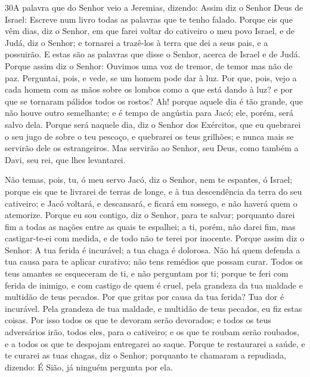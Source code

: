 \medskip

\lettrine{30} A palavra que do Senhor veio a Jeremias,
dizendo: Assim diz o Senhor Deus de Israel: Escreve num livro
todas as palavras que te tenho falado. Porque eis que vêm dias,
diz o Senhor, em que farei voltar do cativeiro o meu povo Israel, e
de Judá, diz o Senhor; e tornarei a trazê-los à terra que dei a seus
pais, e a possuirão. E estas são as palavras que disse o Senhor,
acerca de Israel e de Judá. Porque assim diz o Senhor: Ouvimos
uma voz de tremor, de temor mas não de paz. Perguntai, pois, e
vede, se um homem pode dar à luz. Por que, pois, vejo a cada homem
com as mãos sobre os lombos como a que está dando à luz? e por que
se tornaram pálidos todos os rostos? Ah! porque aquele dia é tão
grande, que não houve outro semelhante; e é tempo de angústia para
Jacó; ele, porém, será salvo dela. Porque será naquele dia, diz
o Senhor dos Exércitos, que eu quebrarei o seu jugo de sobre o teu
pescoço, e quebrarei os teus grilhões; e nunca mais se servirão dele
os estrangeiros. Mas servirão ao Senhor, seu Deus, como também a
Davi, seu rei, que lhes levantarei.

Não temas, pois, tu, ó meu servo Jacó, diz o Senhor, nem te
espantes, ó Israel; porque eis que te livrarei de terras de longe, e
à tua descendência da terra do seu cativeiro; e Jacó voltará, e
descansará, e ficará em sossego, e não haverá quem o atemorize.
Porque eu sou contigo, diz o Senhor, para te salvar;
porquanto darei fim a todas as nações entre as quais te espalhei; a
ti, porém, não darei fim, mas castigar-te-ei com medida, e de todo
não te terei por inocente. Porque assim diz o Senhor: A tua
ferida é incurável; a tua chaga é dolorosa. Não há quem
defenda a tua causa para te aplicar curativo; não tens remédios que
possam curar. Todos os teus amantes se esqueceram de ti, e
não perguntam por ti; porque te feri com ferida de inimigo, e com
castigo de quem é cruel, pela grandeza da tua maldade e multidão de
teus pecados. Por que gritas por causa da tua ferida? Tua dor
é incurável. Pela grandeza de tua maldade, e multidão de teus
pecados, eu fiz estas coisas. Por isso todos os que te
devoram serão devorados; e todos os teus adversários irão, todos
eles, para o cativeiro; e os que te roubam serão roubados, e a todos
os que te despojam entregarei ao saque. Porque te restaurarei
a saúde, e te curarei as tuas chagas, diz o Senhor; porquanto te
chamaram a repudiada, dizendo: É Sião, já ninguém pergunta por ela.

